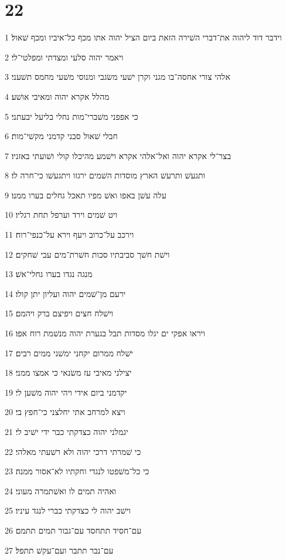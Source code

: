 \chapter{22}

\par 1 וידבר דוד ליהוה את־דברי השׁירה הזאת ביום הציל יהוה אתו מכף כל־איביו ומכף שׁאול׃
\par 2 ויאמר יהוה סלעי ומצדתי ומפלטי־לי׃
\par 3 אלהי צורי אחסה־בו מגני וקרן ישׁעי משׂגבי ומנוסי משׁעי מחמס תשׁעני׃
\par 4 מהלל אקרא יהוה ומאיבי אושׁע׃
\par 5 כי אפפני משׁברי־מות נחלי בליעל יבעתני׃
\par 6 חבלי שׁאול סבני קדמני מקשׁי־מות׃
\par 7 בצר־לי אקרא יהוה ואל־אלהי אקרא וישׁמע מהיכלו קולי ושׁועתי באזניו׃
\par 8 ותגעשׁ ותרעשׁ הארץ מוסדות השׁמים ירגזו ויתגעשׁו כי־חרה לו׃
\par 9 עלה עשׁן באפו ואשׁ מפיו תאכל גחלים בערו ממנו׃
\par 10 ויט שׁמים וירד וערפל תחת רגליו׃
\par 11 וירכב על־כרוב ויעף וירא על־כנפי־רוח׃
\par 12 וישׁת חשׁך סביבתיו סכות חשׁרת־מים עבי שׁחקים׃
\par 13 מנגה נגדו בערו גחלי־אשׁ׃
\par 14 ירעם מן־שׁמים יהוה ועליון יתן קולו׃
\par 15 וישׁלח חצים ויפיצם ברק ויהמם׃
\par 16 ויראו אפקי ים יגלו מסדות תבל בגערת יהוה מנשׁמת רוח אפו׃
\par 17 ישׁלח ממרום יקחני ימשׁני ממים רבים׃
\par 18 יצילני מאיבי עז משׂנאי כי אמצו ממני׃
\par 19 יקדמני ביום אידי ויהי יהוה משׁען לי׃
\par 20 ויצא למרחב אתי יחלצני כי־חפץ בי׃
\par 21 יגמלני יהוה כצדקתי כבר ידי ישׁיב לי׃
\par 22 כי שׁמרתי דרכי יהוה ולא רשׁעתי מאלהי׃
\par 23 כי כל־משׁפטו לנגדי וחקתיו לא־אסור ממנה׃
\par 24 ואהיה תמים לו ואשׁתמרה מעוני׃
\par 25 וישׁב יהוה לי כצדקתי כברי לנגד עיניו׃
\par 26 עם־חסיד תתחסד עם־גבור תמים תתמם׃
\par 27 עם־נבר תתבר ועם־עקשׁ תתפל׃

